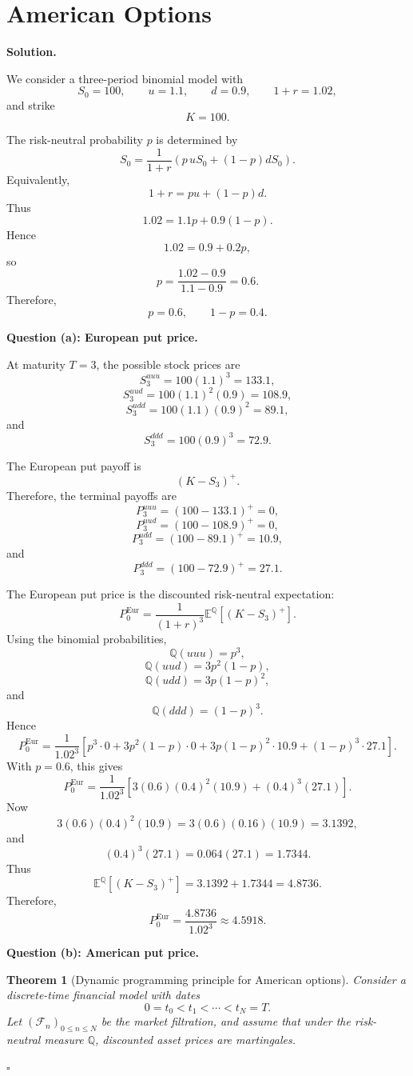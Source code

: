 \documentclass[11pt]{article}
\theoremstyle{plain}
\newtheorem{theorem}{Theorem}[section]
\newcommand{\E}{\mathbb{E}}
\newcommand{\1}{\mathbf{1}}
\theoremstyle{definition}
\newenvironment{solution}
{\par\medskip\noindent\textbf{Solution.}\par\medskip}
{\hfill$\square$\par\medskip}
\newenvironment{solutionpart}[1]
{\par\medskip\noindent\textbf{#1.}\par\smallskip}
{\par\medskip}
\begin{document}
\section{American Options}

\begin{solution}
We consider a three-period binomial model with
\[
S_0=100,
\qquad
u=1.1,
\qquad
d=0.9,
\qquad
1+r=1.02,
\]
and strike
\[
K=100.
\]

The risk-neutral probability $p$ is determined by
\[
S_0
=
\frac{1}{1+r}
\left(
p\,uS_0+(1-p)dS_0
\right).
\]
Equivalently,
\[
1+r=pu+(1-p)d.
\]
Thus
\[
1.02=1.1p+0.9(1-p).
\]
Hence
\[
1.02=0.9+0.2p,
\]
so
\[
p=\frac{1.02-0.9}{1.1-0.9}=0.6.
\]
Therefore,
\[
\boxed{p=0.6,\qquad 1-p=0.4.}
\]

\begin{solutionpart}{Question (a): European put price}

At maturity $T=3$, the possible stock prices are
\[
S_3^{uuu}=100(1.1)^3=133.1,
\]
\[
S_3^{uud}=100(1.1)^2(0.9)=108.9,
\]
\[
S_3^{udd}=100(1.1)(0.9)^2=89.1,
\]
and
\[
S_3^{ddd}=100(0.9)^3=72.9.
\]

The European put payoff is
\[
(K-S_3)^+.
\]
Therefore, the terminal payoffs are
\[
P_3^{uuu}=(100-133.1)^+=0,
\]
\[
P_3^{uud}=(100-108.9)^+=0,
\]
\[
P_3^{udd}=(100-89.1)^+=10.9,
\]
and
\[
P_3^{ddd}=(100-72.9)^+=27.1.
\]

The European put price is the discounted risk-neutral expectation:
\[
P_0^{\mathrm{Eur}}
=
\frac{1}{(1+r)^3}
\E^{\mathbb{Q}}\left[(K-S_3)^+\right].
\]
Using the binomial probabilities,
\[
\mathbb{Q}(uuu)=p^3,
\]
\[
\mathbb{Q}(uud)=3p^2(1-p),
\]
\[
\mathbb{Q}(udd)=3p(1-p)^2,
\]
and
\[
\mathbb{Q}(ddd)=(1-p)^3.
\]
Hence
\[
P_0^{\mathrm{Eur}}
=
\frac{1}{1.02^3}
\left[
p^3\cdot 0
+
3p^2(1-p)\cdot 0
+
3p(1-p)^2\cdot 10.9
+
(1-p)^3\cdot 27.1
\right].
\]
With $p=0.6$, this gives
\[
P_0^{\mathrm{Eur}}
=
\frac{1}{1.02^3}
\left[
3(0.6)(0.4)^2(10.9)
+
(0.4)^3(27.1)
\right].
\]
Now
\[
3(0.6)(0.4)^2(10.9)
=
3(0.6)(0.16)(10.9)
=
3.1392,
\]
and
\[
(0.4)^3(27.1)=0.064(27.1)=1.7344.
\]
Thus
\[
\E^{\mathbb{Q}}\left[(K-S_3)^+\right]
=
3.1392+1.7344
=
4.8736.
\]
Therefore,
\[
\boxed{
P_0^{\mathrm{Eur}}
=
\frac{4.8736}{1.02^3}
\approx 4.5918.
}
\]
\end{solutionpart}

\begin{solutionpart}{Question (b): American put price}

\begin{theorem}[Dynamic programming principle for American options]
Consider a discrete-time financial model with dates
\[
0=t_0<t_1<\cdots<t_N=T.
\]
Let $(\mathcal F_n)_{0\le n\le N}$ be the market filtration, and assume that under the risk-neutral measure
$\mathbb Q$, discounted asset prices are martingales.


\end{theorem}
\end{solutionpart}
\end{solution}
\end{document}
